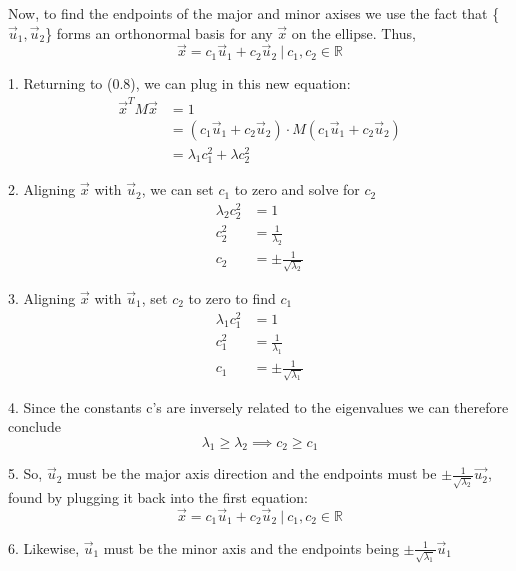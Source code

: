 \documentclass[12pt]{article}
\begin{document}
\vspace{0.5cm}

\noindent{}Now, to find the endpoints of the major and minor axises we use the fact that \{$\vec{u}_1, \vec{u}_2$\} forms an orthonormal basis for any $\vec{x}$ on the ellipse. Thus,
\[
    \vec{x} = c_1\vec{u}_1 + c_2\vec{u}_2 ~|~ c_1, c_2 \in{\mathbb{R}}
\]

1. Returning to (0.8), we can plug in this new equation:
\begin{align*}
    \vec{x}^TM\vec{x} & = 1                                                                    \\
                      & =(c_1\vec{u}_1 + c_2\vec{u}_2) \cdot{M}  (c_1\vec{u}_1 + c_2\vec{u}_2) \\
                      & = \lambda{}_1c_1^2 + \lambda{}c_2^2
\end{align*}

2. Aligning $\vec{x}$ with $\vec{u}_2$, we can set $c_1$ to zero and solve for $c_2$
\begin{align*}
    \lambda{}_2c_2^2 & = 1                                  \\
    c_2^2            & = \tfrac{1}{\lambda{}_2}             \\
    c_2              & = \pm{}\tfrac{1}{\sqrt{\lambda{}_2}}
\end{align*}

3.  Aligning $\vec{x}$ with $\vec{u}_1$, set $c_2$ to zero to find $c_1$
\begin{align*}
    \lambda{}_1c_1^2 & = 1                                  \\
    c_1^2            & = \tfrac{1}{\lambda{}_1}             \\
    c_1              & = \pm{}\tfrac{1}{\sqrt{\lambda{}_1}}
\end{align*}

4. Since the constants c's are inversely related to the eigenvalues we can therefore conclude
\[
    \lambda{}_1 \geq{} \lambda{}_2 \implies{c_2\geq{c_1}}
\]

5. So, $\vec{u}_2$ must be the major axis direction and the endpoints must be $\pm{}\tfrac{1}{\sqrt{\lambda{}_2}}\vec{u_2}$, found by plugging it back into the first equation:
\[
    \vec{x} = c_1\vec{u}_1 + c_2\vec{u}_2 ~|~ c_1, c_2 \in{\mathbb{R}}
\]

6. Likewise, $\vec{u}_1$ must be the minor axis and the endpoints being $\pm{}\tfrac{1}{\sqrt{\lambda{}_1}}\vec{u}_1$

\vspace{0.5cm}
\end{document}
